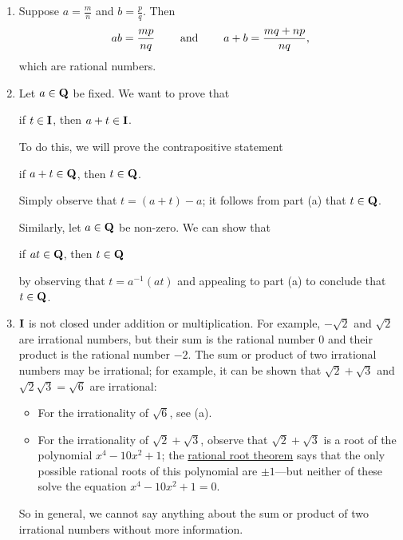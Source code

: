\documentclass{lew98_solutions}
\begin{document}
\begin{solution}
    \begin{enumerate}
        \item Suppose \( a = \tfrac{m}{n} \) and \( b = \tfrac{p}{q} \). Then
        \[
            ab = \frac{mp}{nq} \hspace{8mm} \text{and} \hspace{8mm} a + b = \frac{mq + np}{nq},
        \]
        which are rational numbers.

        \item Let \( a \in \mathbf{Q} \) be fixed. We want to prove that
        \begin{center}
            if \( t \in \mathbf{I} \), then \( a + t \in \mathbf{I} \).
        \end{center}
        To do this, we will prove the contrapositive statement
        \begin{center}
            if \( a + t \in \mathbf{Q} \), then \( t \in \mathbf{Q} \).
        \end{center}
        Simply observe that \( t = (a + t) - a \); it follows from part (a) that \( t \in \mathbf{Q} \).

        Similarly, let \( a \in \mathbf{Q} \) be non-zero. We can show that
        \begin{center}
            if \( at \in \mathbf{Q} \), then \( t \in \mathbf{Q} \)
        \end{center}
        by observing that \( t = a^{-1}(at) \) and appealing to part (a) to conclude that \( t \in \mathbf{Q} \).

        \item \( \mathbf{I} \) is not closed under addition or multiplication. For example, \( -\sqrt{2} \) and \( \sqrt{2} \) are irrational numbers, but their sum is the rational number 0 and their product is the rational number \( -2 \). The sum or product of two irrational numbers may be irrational; for example, it can be shown that \( \sqrt{2} + \sqrt{3} \) and \( \sqrt{2} \sqrt{3} = \sqrt{6} \) are irrational:
        \begin{itemize}
            \item For the irrationality of \( \sqrt{6} \), see  (a).

            \item For the irrationality of \( \sqrt{2} + \sqrt{3} \), observe that \( \sqrt{2} + \sqrt{3} \) is a root of the polynomial \( x^4 - 10 x^2 + 1 \); the \href{https://en.wikipedia.org/wiki/Rational_root_theorem}{rational root theorem} says that the only possible rational roots of this polynomial are \( \pm 1 \)---but neither of these solve the equation \( x^4 - 10 x^2 + 1 = 0 \).
        \end{itemize}
        So in general, we cannot say anything about the sum or product of two irrational numbers without more information.
    \end{enumerate}
\end{solution}
\end{document}
